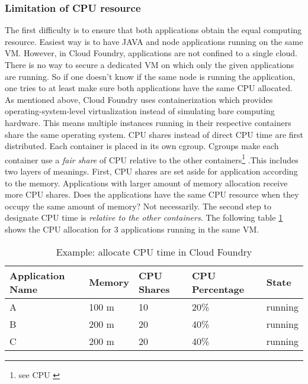 \subsubsection{Limitation of CPU resource}
\label{cpu limitation}
The first difficulty is to ensure that both applications obtain the equal computing resource. Easiest way is to have JAVA and node applications running on the same VM. However, in Cloud Foundry, applications are not confined to a single cloud. There is no way to secure a dedicated VM on which only the given applications are running. So if one doesn't know if the same node is running the application, one tries to at least make sure both applications have the same CPU allocated. As mentioned above, Cloud Foundry uses containerization which provides operating-system-level virtualization instead of simulating bare computing hardware. This means multiple instances running in their respective containers share the same operating system. CPU shares instead of direct CPU time are first distributed. Each container is placed in its own cgroup. Cgroups make each container use a \textit{fair share} of CPU relative to the other containers\footnote{see CPU  \citep{CGroup} } .This includes two layers of meanings. First, CPU shares are set aside for application according to the memory. Applications with larger amount of memory allocation receive more CPU shares. Does the applications have the same CPU resource when they occupy the same amount of memory? Not necessarily. The second step to designate CPU time is \textit{relative to the other containers}. The following table \ref{CPU time in Cloud Foundry} shows the CPU allocation for 3 applications running in the same VM. 
\begin{table}[h]
	\caption{Example: allocate CPU time in Cloud Foundry}
	\label{CPU time in Cloud Foundry}
	\renewcommand{\arraystretch}{1.2}
	\centering
	\sffamily
	\begin{footnotesize}
		\begin{tabular}{l l l l l }
			\toprule
			\textbf{Application Name} & \textbf{Memory} & \textbf{CPU Shares}& \textbf{CPU Percentage} }& \textbf{State}\\
			\midrule
		    A 	&	100	m & 10 & 20\%   & running\\
			B	&	200 m & 20 & 40\% & running\\
			C	&	200 m &	20 & 40\% & running\\
			\bottomrule
		\end{tabular}
	\end{footnotesize}
	\rmfamily
\end{table}

